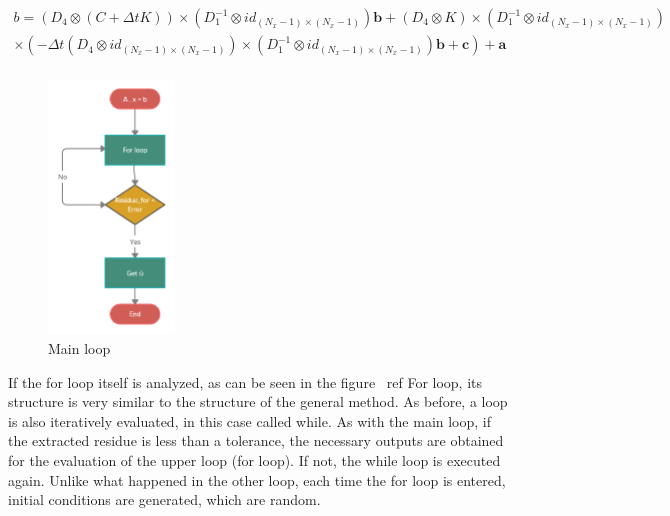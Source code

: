 \documentclass[a4paper, 10pt]{article}
\begin{document}
$$
\begin{array}{c}
b = \left(D_4 \otimes  \left( C + \Delta t K\right) \right) \times \left( D_1^{-1} \otimes  id_{(N_x-1)\times(N_x-1)}\right)  \mathbf{b} +\left( D_4 \otimes   K\right) \times \left( D_1^{-1} \otimes  id_{(N_x-1)\times(N_x-1)}\right)  \\
  \times \left( - \Delta t \left(D_4 \otimes  id_{(N_x-1)\times(N_x-1)} \right) \times \left( D_1^{-1} \otimes  id_{(N_x-1)\times(N_x-1)}\right) \mathbf{b}  + \mathbf{c}  \right) + \mathbf{a} \\
\end{array}
$$



\begin{figure}
\centering
\includegraphics[width=0.30\textwidth]{Main block (1).png}
\caption{Main loop} 
\label{Main loop}
\end{figure}

\newpage

If the for loop itself is analyzed, as can be seen in the figure \ ref {For loop}, its structure is very similar to the structure of the general method. As before, a loop is also iteratively evaluated, in this case called while. As with the main loop, if the extracted residue is less than a tolerance, the necessary outputs are obtained for the evaluation of the upper loop (for loop). If not, the while loop is executed again. Unlike what happened in the other loop, each time the for loop is entered, initial conditions are generated, which are random.
\end{document}
